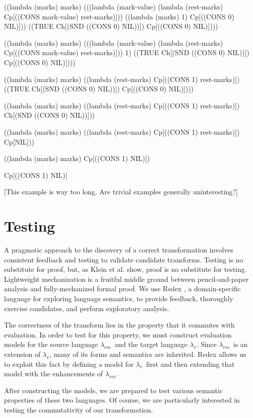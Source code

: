 \documentclass{llncs}
\newcommand{\cm}[0]{$\lambda_{cm}$}
\newcommand{\lv}[0]{$\lambda_v$}
\begin{document}
\begin{schemedisplay}
((lambda (marks) marks)
 (((lambda (mark-value) (lambda (rest-marks) Cp[((CONS mark-value) rest-marks)]))
   ((lambda (marks) 1) Cp[((CONS 0) NIL)]))
  ((TRUE Ch[(SND ((CONS 0) NIL))]) Cp[((CONS 0) NIL)])))

((lambda (marks) marks)
 (((lambda (mark-value) (lambda (rest-marks) Cp[((CONS mark-value) rest-marks)]))
   1)
  ((TRUE Ch[(SND ((CONS 0) NIL))]) Cp[((CONS 0) NIL)])))

((lambda (marks) marks)
 ((lambda (rest-marks) Cp[((CONS 1) rest-marks)])
  ((TRUE Ch[(SND ((CONS 0) NIL))]) Cp[((CONS 0) NIL)])))

((lambda (marks) marks)
 ((lambda (rest-marks) Cp[((CONS 1) rest-marks)])
  Ch[(SND ((CONS 0) NIL))]))

((lambda (marks) marks)
 ((lambda (rest-marks) Cp[((CONS 1) rest-marks)])
  Cp[NIL]))

((lambda (marks) marks)
 Cp[((CONS 1) NIL)])

Cp[((CONS 1) NIL)]
\end{schemedisplay}

[This example is way too long. Are trivial examples generally uninteresting?]

\section{Testing}
\label{sec-testing}

A pragmatic approach to the discovery of a correct transformation involves consistent feedback and testing to validate candidate transforms. Testing is no substitute for proof, but, as Klein et al. \cite{klein2012run} show, proof is no substitute for testing. Lightweight mechanization is a fruitful middle ground between pencil-and-paper analysis and fully-mechanized formal proof. We use Redex \cite{findler2010redex}, a domain-specific language for exploring language semantics, to provide feedback, thoroughly exercise candidates, and perform exploratory analysis.

The correctness of the transform lies in the property that it commutes with evaluation. In order to test for this property, we must construct evaluation models for the source language \cm\ and the target language \lv. Since \cm\ is an extension of \lv, many of its forms and semantics are inherited. Redex allows us to exploit this fact by defining a model for \lv\ first and then extending that model with the enhancements of \cm.

After constructing the models, we are prepared to test various semantic properties of these two languages. Of course, we are particularly interested in testing the commutativity of our transformation.
\end{document}
